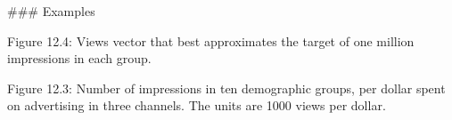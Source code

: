 

### Examples

Figure 12.4: Views vector that best approximates the target of one million impressions in each group.

Figure 12.3: Number of impressions in ten demographic groups, per dollar spent on advertising in three channels. The units are 1000 views per dollar.

